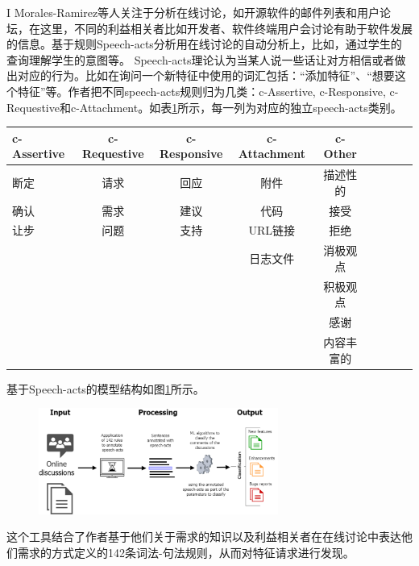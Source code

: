 I Morales-Ramirez等人\cite{Morales2019Speech}关注于分析在线讨论，如开源软件的邮件列表和用户论坛，在这里，不同的利益相关者比如开发者、软件终端用户会讨论有助于软件发展的信息。基于规则Speech-acts分析\cite{morales2014discovering}用在线讨论的自动分析上，比如，通过学生的查询理解学生的意图\cite{feng2006intelligent}等。 Speech-acts理论认为当某人说一些话让对方相信或者做出对应的行为\cite{acts1969essay}。比如在询问一个新特征中使用的词汇包括：“添加特征”、“想要这个特征”等。作者把不同speech-acts规则归为几类：c-Assertive, c-Responsive, c-Requestive和c-Attachment。如表\ref{tab:speech-act0}所示，每一列为对应的独立speech-acts类别。
\begin{table}[htbp]
    \label{tab:speech-act0}
    \centering
    \footnotesize%
    \setlength{\tabcolsep}{4pt}%
    \renewcommand{\arraystretch}{1.2}%
\begin{tabular}{lcccccccc}
\hline
c-Assertive & c-Requestive & c-Responsive & c-Attachment & c-Other          \\
\hline
断定        & 请求         & 回应         & 附件         & 描述性的      \\
确认        & 需求         & 建议         & 代码         & 接受           \\
让步        & 问题         & 支持         & URL链接      & 拒绝           \\
            &              &              & 日志文件     & 消极观点 \\
            &              &              &              & 积极观点  \\
            &              &              &              & 感谢            \\
            &              &              &              & 内容丰富的 \\
\hline            
\end{tabular}
\end{table}


基于Speech-acts的模型结构如图\ref{fig:speech-acts1}所示。
\begin{figure}[htbp]
    \centering
    \includegraphics[width=0.70\textwidth]{Img/speech-acts1.png}
    \label{fig:speech-acts1}
\end{figure}
这个工具结合了作者基于他们关于需求的知识以及利益相关者在在线讨论中表达他们需求的方式定义的142条词法-句法规则，从而对特征请求进行发现。

